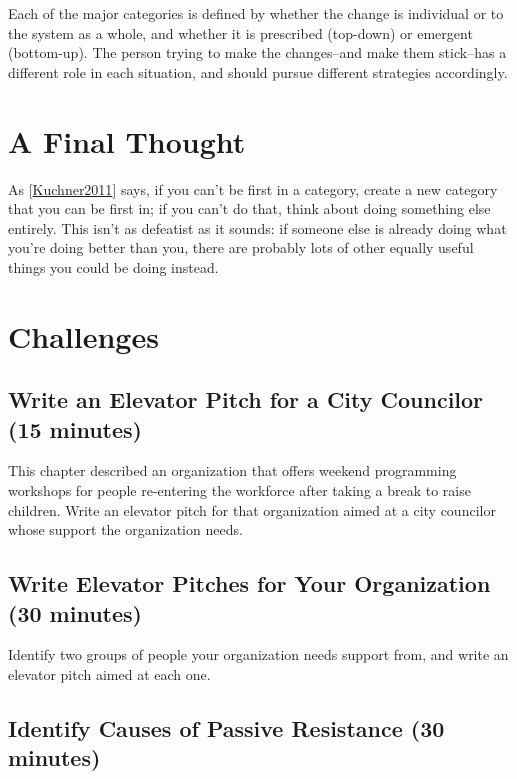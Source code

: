 \documentclass[10pt,statementpaper]{memoir}
\begin{document}
Each of the major categories is defined by whether the change is
individual or to the system as a whole, and whether it is prescribed
(top-down) or emergent (bottom-up). The person trying to make the
changes--and make them stick--has a different role in each situation,
and should pursue different strategies accordingly.

\section{A Final Thought}\label{a-final-thought}

As {[}\href{biblio.html\#kuchner-marketing}{Kuchner2011}{]} says, if you
can't be first in a category, create a new category that you can be
first in; if you can't do that, think about doing something else
entirely. This isn't as defeatist as it sounds: if someone else is
already doing what you're doing better than you, there are probably lots
of other equally useful things you could be doing instead.

\section{Challenges}\label{challenges-11}

\subsection{Write an Elevator Pitch for a City Councilor (15
minutes)}\label{write-an-elevator-pitch-for-a-city-councilor-15-minutes}

This chapter described an organization that offers weekend programming
workshops for people re-entering the workforce after taking a break to
raise children. Write an elevator pitch for that organization aimed at a
city councilor whose support the organization needs.

\subsection{Write Elevator Pitches for Your Organization (30
minutes)}\label{write-elevator-pitches-for-your-organization-30-minutes}

Identify two groups of people your organization needs support from, and
write an elevator pitch aimed at each one.

\subsection{Identify Causes of Passive Resistance (30
minutes)}\label{identify-causes-of-passive-resistance-30-minutes}
\end{document}
